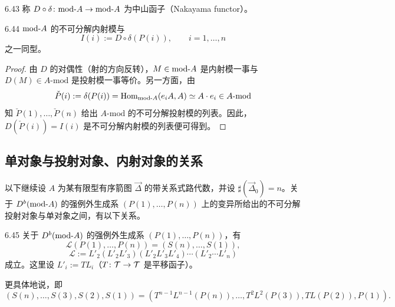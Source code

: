 \begin{definition}{6.43}
称 $D\circ\delta\colon\mathrm{mod}\text{-}A\to\mathrm{mod}\text{-}A$ 为中山函子（Nakayama functor）。
\end{definition}

\begin{theorem}{6.44}
$\mathrm{mod}\text{-}A$ 的不可分解内射模与
\[
I(i):=D\circ\delta(P(i)),\qquad i=1,\dots,n
\]
之一同型。
\end{theorem}

\begin{proof}
由 $D$ 的对偶性（射的方向反转），$M\in\mathrm{mod}\text{-}A$ 是内射模一事与 $D(M)\in A\text{-}\mathrm{mod}$ 是投射模一事等价。另一方面，由
\[
\check P(i):=\delta(P(i))=\operatorname{Hom}_{\mathrm{mod}\text{-}A}(e_iA,A)\simeq A\cdot e_i\in A\text{-}\mathrm{mod}
\]
知 $\check P(1),\dots,\check P(n)$ 给出 $A\text{-}\mathrm{mod}$ 的不可分解投射模的列表。因此，$D(\check P(i))=I(i)$ 是不可分解内射模的列表便可得到。
\end{proof}

\subsection{单对象与投射对象、内射对象的关系}

以下继续设 $A$ 为某有限型有序箭图 $\vec{\Delta}$ 的带关系式路代数，并设 $\sharp(\vec{\Delta}_0)=n$。关于 $D^{b}(\mathrm{mod}\text{-}A)$ 的强例外生成系 $(P(1),\dots,P(n))$ 上的变异所给出的不可分解投射对象与单对象之间，有以下关系。

\begin{proposition}{6.45}
关于 $D^{b}(\mathrm{mod}\text{-}A)$ 的强例外生成系 $(P(1),\dots,P(n))$，有
\[
\mathcal L(P(1),\dots,P(n))=(S(n),\dots,S(1)),
\]
\[
\mathcal L:=L'_2(L'_2L'_3)(L'_2L'_3L'_4)\cdots(L'_2\cdots L'_n)
\]
成立。这里设 $L'_i:=TL_i$（$T\colon\mathcal{T}\to\mathcal{T}$ 是平移函子）。
\end{proposition}

更具体地说，即
\[
(S(n),\dots,S(3),S(2),S(1))=(T^{n-1}L^{n-1}(P(n)),\dots,T^{2}L^{2}(P(3)),TL(P(2)),P(1)).
\]

